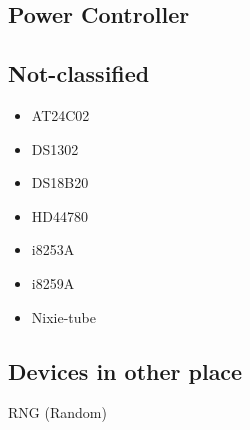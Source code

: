 \subsection{Power Controller}



\subsection{Not-classified}

\begin{itemize}

\item AT24C02
\item DS1302
\item DS18B20
\item HD44780
\item i8253A
\item i8259A
\item Nixie-tube
\end{itemize}



\subsection{Devices in other place}

RNG (Random)

